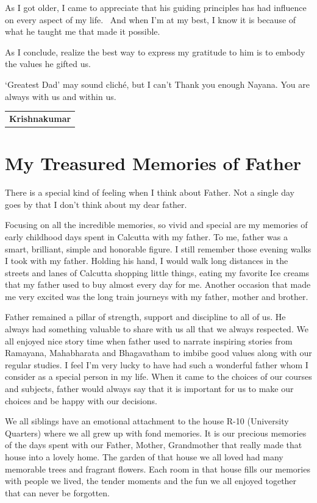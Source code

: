 As I got older, I came to appreciate that his guiding principles has had influence on every aspect of my life.  And when I’m at my best, I know it is because of what he taught me that made it possible. 

As I conclude, realize the best way to express my gratitude to him is to embody the values he gifted us. 

‘Greatest Dad’ may sound cliché, but I can’t Thank you enough Nayana. You are always with us and within us.
\bigskip

\begin{flushright}
\begin{tabular}{c}
\multicolumn{1}{p{2cm}}{\textbf{Krishnakumar}}
\end{tabular}
\end{flushright}
\newpage

\section*{My Treasured Memories of Father}

There is a special kind of feeling when I think about Father.  Not a single day goes by that I don’t think about my dear father.
\medskip

Focusing on all the incredible memories, so vivid and special are my memories of early childhood days spent in Calcutta with my father. To me, father was a smart, brilliant, simple and honorable figure. I still remember those evening walks I took with my father. Holding his hand, I would walk long distances in the streets and lanes of Calcutta shopping little things, eating my favorite Ice creams that my father used to buy almost every day for me. Another occasion that made me very excited was the long train journeys with my father, mother and brother.
\medskip

Father remained a pillar of strength, support and discipline to all of us. He always had something valuable to share with us all that we always respected. We all enjoyed nice story time when father used to narrate inspiring stories from Ramayana, Mahabharata and Bhagavatham to imbibe good values along with our regular studies. I feel I’m very lucky to have had such a wonderful father whom I consider as a special person in my life. When it came to the choices of our courses and subjects, father would always say that it is important for us to make our choices and be happy with our decisions.
\medskip

We all siblings have an emotional attachment to the house R-10 (University Quarters) where we all grew up with fond memories. It is our precious memories of the days spent with our Father, Mother, Grandmother that really made that house into a lovely home. The garden of that house we all loved had many memorable trees and fragrant flowers. Each room in that house fills our memories with people we lived, the tender moments and the fun we all enjoyed together that can never be forgotten.
\medskip

